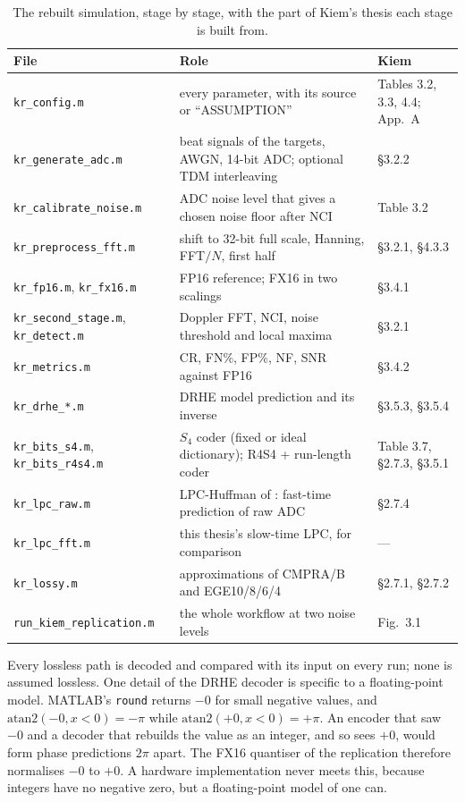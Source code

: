 \begin{table}[htbp]
\centering
\caption[Replication: stages and sources]{The rebuilt simulation, stage by
stage, with the part of Kiem's thesis each stage is built from.}
\label{tab:kr_files}
\small
\begin{tabular}{@{}p{42mm}p{62mm}p{28mm}@{}}
\toprule
File & Role & Kiem\\
\midrule
\texttt{kr\_config.m} & every parameter, with its source or ``ASSUMPTION'' & Tables 3.2, 3.3, 4.4; App.\ A\\
\texttt{kr\_generate\_adc.m} & beat signals of the targets, AWGN, 14-bit ADC; optional TDM interleaving & \S{}3.2.2\\
\texttt{kr\_calibrate\_noise.m} & ADC noise level that gives a chosen noise floor after NCI & Table 3.2\\
\texttt{kr\_preprocess\_fft.m} & shift to 32-bit full scale, Hanning, FFT$/N$, first half & \S{}3.2.1, \S{}4.3.3\\
\texttt{kr\_fp16.m}, \texttt{kr\_fx16.m} & FP16 reference; FX16 in two scalings & \S{}3.4.1\\
\texttt{kr\_second\_stage.m}, \texttt{kr\_detect.m} & Doppler FFT, NCI, noise threshold and local maxima & \S{}3.2.1\\
\texttt{kr\_metrics.m} & CR, FN\%, FP\%, NF, SNR against FP16 & \S{}3.4.2\\
\texttt{kr\_drhe\_*.m} & DRHE model prediction and its inverse & \S{}3.5.3, \S{}3.5.4\\
\texttt{kr\_bits\_s4.m}, \texttt{kr\_bits\_r4s4.m} & $S_4$ coder (fixed or ideal dictionary); R4S4 + run-length coder & Table 3.7, \S{}2.7.3, \S{}3.5.1\\
\texttt{kr\_lpc\_raw.m} & LPC-Huffman of \cite{meucci2022}: fast-time prediction of raw ADC & \S{}2.7.4\\
\texttt{kr\_lpc\_fft.m} & this thesis's slow-time LPC, for comparison & ---\\
\texttt{kr\_lossy.m} & approximations of CMPRA/B and EGE10/8/6/4 & \S{}2.7.1, \S{}2.7.2\\
\texttt{run\_kiem\_replication.m} & the whole workflow at two noise levels & Fig.\ 3.1\\
\bottomrule
\end{tabular}
\end{table}

Every lossless path is decoded and compared with its input on every run; none
is assumed lossless. One detail of the DRHE decoder is specific to a
floating-point model. MATLAB's \texttt{round} returns $-0$ for small negative
values, and $\mathrm{atan2}(-0, x<0) = -\pi$ while
$\mathrm{atan2}(+0, x<0) = +\pi$. An encoder that saw $-0$ and a decoder that
rebuilds the value as an integer, and so sees $+0$, would form phase
predictions $2\pi$ apart. The FX16 quantiser of the replication therefore
normalises $-0$ to $+0$. A hardware implementation never meets this, because
integers have no negative zero, but a floating-point model of one can.

